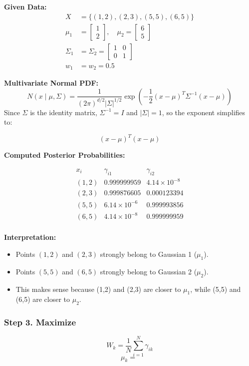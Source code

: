 \documentclass{article}
\begin{document}
\noindent \textbf{Given Data:}
\begin{align*}
X &= \{(1,2), (2,3), (5,5), (6,5)\} \\
\mu_1 &= \begin{bmatrix} 1 \\ 2 \end{bmatrix}, \quad
\mu_2 = \begin{bmatrix} 6 \\ 5 \end{bmatrix} \\
\Sigma_1 &= \Sigma_2 = \begin{bmatrix} 1 & 0 \\ 0 & 1 \end{bmatrix} \\
w_1 &= w_2 = 0.5
\end{align*}

\noindent \textbf{Multivariate Normal PDF:}
\[
N(x \mid \mu, \Sigma) = \frac{1}{(2\pi)^{d/2} |\Sigma|^{1/2}} 
\exp \left( -\frac{1}{2} (x - \mu)^T \Sigma^{-1} (x - \mu) \right)
\]
Since \(\Sigma\) is the identity matrix, \(\Sigma^{-1} = I\) and \(|\Sigma| = 1\), so the exponent simplifies to:

\[
(x - \mu)^T (x - \mu)
\]

\noindent \textbf{Computed Posterior Probabilities:}

\[
\begin{array}{c|cc}
x_i & \gamma_{i1} & \gamma_{i2} \\
\hline
(1,2) & 0.999999959 & 4.14 \times 10^{-8} \\
(2,3) & 0.999876605 & 0.000123394 \\
(5,5) & 6.14 \times 10^{-6} & 0.999993856 \\
(6,5) & 4.14 \times 10^{-8} & 0.999999959 \\
\end{array}
\]

\noindent \textbf{Interpretation:}
\begin{itemize}
    \item Points \((1,2)\) and \((2,3)\) strongly belong to Gaussian 1 (\(\mu_1\)).
    \item Points \((5,5)\) and \((6,5)\) strongly belong to Gaussian 2 (\(\mu_2\)).
    \item This makes sense because (1,2) and (2,3) are closer to \(\mu_1\), while (5,5) and (6,5) are closer to \(\mu_2\).
\end{itemize}
\subsubsection*{Step 3. Maximize}
\[
W_k = \frac{1}{N}\sum_{i=1}^{N} \gamma_{ik}
\]
\[
\mu_k = \
\]
\end{document}
